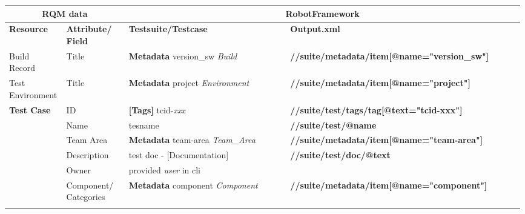 \begin{table}[h]
   \label{table:RobotResults2RQM-mapping}
   \begin{tabular}{|p{0.11\linewidth}|p{0.12\linewidth}|p{0.31\linewidth}|p{0.45\linewidth}|}
      \hline
      \multicolumn{2}{|c|}{\textbf{RQM data}}
                                      &\multicolumn{2}{|c|}{\textbf{RobotFramework}}\\
      \hline
      \textbf{Resource} &\textbf{Attribute/ Field}
                                      &\textbf{Testsuite/Testcase}   
                                                    &\textbf{Output.xml}\\
      \hline
      Build Record      &Title        &\textbf{Metadata} version\_sw \emph{Build}   
                                                    &\textbf{//suite/metadata/item[@name="version\_sw"]}\\
      \hline
      Test Environment  &Title        &\textbf{Metadata} project \emph{Environment} 
                                                    &\textbf{//suite/metadata/item[@name="project"]}\\
      \hline
      \multirow{8}{*}{\textbf{Test Case}} 
                        &ID           &\textbf{[Tags]} tcid-\emph{xxx} 
                                                    &\textbf{//suite/test/tags/tag[@text="tcid-xxx"]}\\
                        \cline{2-4}
                        &Name         &tesname      &\textbf{//suite/test/@name}\\
                        \cline{2-4}
                        &Team Area    &\textbf{Metadata} team-area \emph{Team\_Area} 
                                                    &\textbf{//suite/metadata/item[@name="team-area"]}\\
                        \cline{2-4}
                        &Description  &test doc - [Documentation]  
                                                    &\textbf{//suite/test/doc/@text}\\
                        \cline{2-4}
                        &Owner        &provided \emph{user} in cli  
                                                    &\\
                        \cline{2-4}
                        &Component/ Categories 
                                      &\textbf{Metadata} component \emph{Component}
                                                    &\textbf{//suite/metadata/item[@name="component"]}\\
                        \cline{2-4}

\end{tabular}
\end{table}
